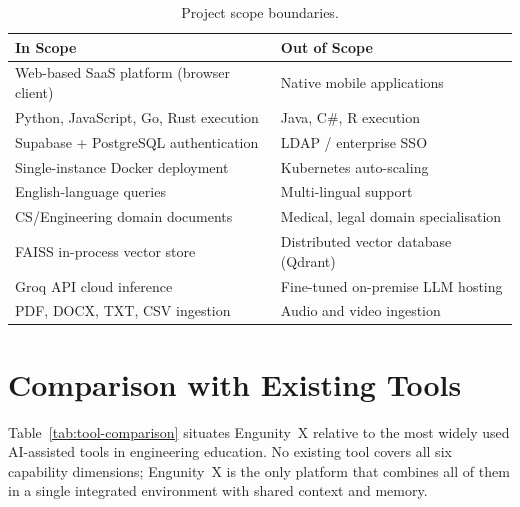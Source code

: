 \begin{table}[ht]
    \centering
    \caption{Project scope boundaries.}
    \label{tab:scope}
    \renewcommand{\arraystretch}{1.3}
    \begin{tabular}{p{5.5cm} p{5.5cm}}
        \toprule
        \textbf{In Scope} & \textbf{Out of Scope} \\
        \midrule
        Web-based SaaS platform (browser client) & Native mobile applications \\
        Python, JavaScript, Go, Rust execution & Java, C\#, R execution \\
        Supabase + PostgreSQL authentication & LDAP / enterprise SSO \\
        Single-instance Docker deployment & Kubernetes auto-scaling \\
        English-language queries & Multi-lingual support \\
        CS/Engineering domain documents & Medical, legal domain specialisation \\
        FAISS in-process vector store & Distributed vector database (Qdrant) \\
        Groq API cloud inference & Fine-tuned on-premise LLM hosting \\
        PDF, DOCX, TXT, CSV ingestion & Audio and video ingestion \\
        \bottomrule
    \end{tabular}
\end{table}

\section{Comparison with Existing Tools}
\label{sec:comparison}

Table~\ref{tab:tool-comparison} situates Engunity~X relative to the most widely used AI-assisted tools in engineering education. No existing tool covers all six capability dimensions; Engunity~X is the only platform that combines all of them in a single integrated environment with shared context and memory.

